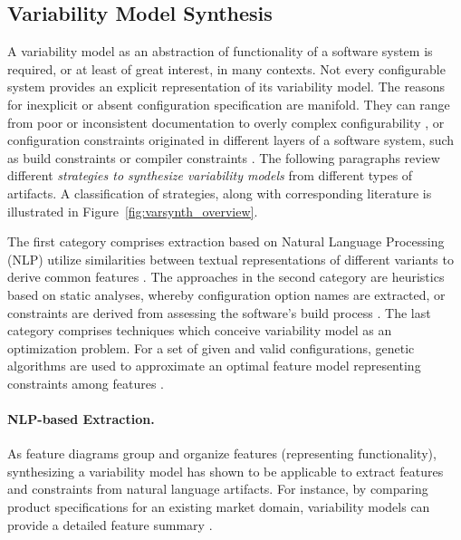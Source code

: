 \subsection{Variability Model Synthesis} \label{sec:feature_model_synthesis} 
A variability model as an abstraction of functionality of a software system is
required, or at least of great interest, in many contexts. Not every
configurable system provides an explicit representation of its variability
model. The reasons for inexplicit or absent configuration specification are
manifold. They can range from poor or inconsistent documentation
\citep{rabkin_static_2011} to overly complex configurability
\citep{xu_hey_2015}, or configuration constraints originated in different layers of a software system,
such as build constraints or compiler constraints
\citep{nadi_mining_2014,nadi_where_2015}.
The following paragraphs review different \emph{strategies to synthesize
variability models} from different types of artifacts. A classification of
strategies, along with corresponding literature is illustrated in
Figure~\ref{fig:varsynth_overview}.

The first category comprises extraction based on Natural Language Processing (NLP) utilize
similarities between textual representations of different variants to derive
common features \citep{alves_exploratory_2008,bakar_feature_2015}. The
approaches in the second category are heuristics based on static analyses, whereby configuration option names \citep{rabkin_static_2011} are
extracted, or constraints are derived from assessing the software’s build
process \citep{nadi_mining_2014,nadi_where_2015}. The last category comprises
techniques which conceive variability model as an optimization problem. For a set of given and
valid configurations, genetic algorithms are used to approximate an optimal
feature model representing constraints among features 
\citep{lopez-herrejon_reverse_2012,lopez-herrejon_assessment_2015,linsbauer_feature_2014}.

\paragraph{NLP-based Extraction.} As feature diagrams group and organize
features (representing functionality), synthesizing a variability model has shown to be applicable to extract features
and constraints from natural language artifacts. For instance, by comparing
product specifications for an existing market domain, variability models can
provide a detailed feature summary \citep{alves_exploratory_2008}.

